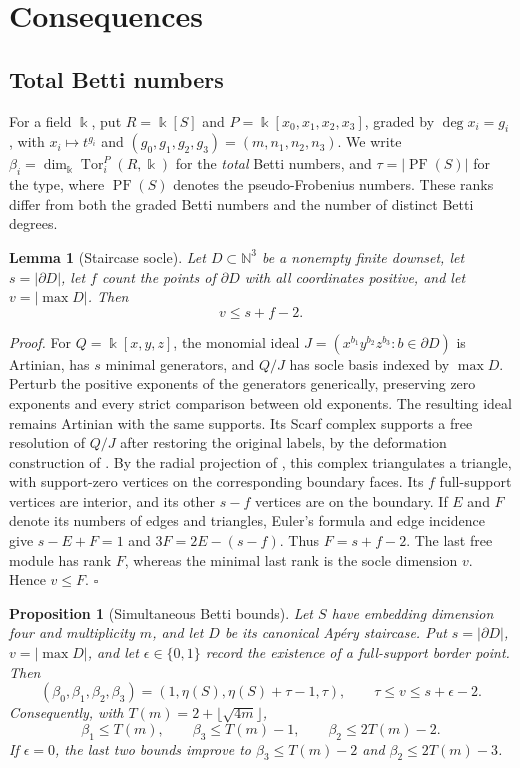 \documentclass[11pt]{article}
\newtheorem{lemma}[theorem]{Lemma}
\newtheorem{proposition}[theorem]{Proposition}
\begin{document}
\section{Consequences}\label{sec:betti}
\subsection{Total Betti numbers}

For a field $\Bbbk$, put $R=\Bbbk[S]$ and
$P=\Bbbk[x_0,x_1,x_2,x_3]$, graded by $\deg x_i=g_i$, with $x_i\mapsto t^{g_i}$ and
$(g_0,g_1,g_2,g_3)=(m,n_1,n_2,n_3)$.  We write
$\beta_i=\dim_{\Bbbk}\operatorname{Tor}_i^P(R,\Bbbk)$ for the
\emph{total} Betti numbers, and $\tau=|\operatorname{PF}(S)|$ for the type, where $\operatorname{PF}(S)$ denotes the pseudo-Frobenius numbers.
These ranks differ from both the graded Betti numbers and the number of
distinct Betti degrees.

\medskip
\begin{lemma}[Staircase socle]\label{lem:socle}
Let $D\subset\mathbb N^3$ be a nonempty finite downset, let
$s=|\partial D|$, let $f$ count the points of $\partial D$ with all
coordinates positive, and let $v=|\max D|$.  Then
\[
v\le s+f-2.
\]\end{lemma}
\emph{Proof.}
For $Q=\Bbbk[x,y,z]$, the monomial ideal
$J=(x^{b_1}y^{b_2}z^{b_3}:b\in\partial D)$ is Artinian, has $s$ minimal
generators, and $Q/J$ has socle basis indexed by $\max D$.
Perturb the positive exponents of the generators generically, preserving
zero exponents and every strict comparison between old exponents.
The resulting ideal remains Artinian with the same supports.  Its Scarf
complex supports a free resolution of $Q/J$ after restoring the original
labels, by the deformation construction of
\cite[Theorem~4.3 and Corollary~4.4]{BPS98}.
By the radial projection of \cite[Construction~5.4 and Corollary~5.5]{BPS98}, this complex triangulates a triangle, with support-zero vertices on the corresponding boundary faces.
Its $f$ full-support vertices are interior, and its other $s-f$ vertices
are on the boundary.  If $E$ and $F$ denote its numbers of edges and
triangles, Euler's formula and edge incidence give
$s-E+F=1$ and $3F=2E-(s-f)$.  Thus $F=s+f-2$.
The last free module has rank $F$, whereas the minimal last rank is the
socle dimension $v$.  Hence $v\le F$. \hfill$\square$

\medskip
\begin{proposition}[Simultaneous Betti bounds]\label{prop:betti}
Let $S$ have embedding dimension four and multiplicity $m$, and let
$D$ be its canonical Ap\'ery staircase.  Put $s=|\partial D|$,
$v=|\max D|$, and let $\epsilon\in\{0,1\}$ record the existence of a
full-support border point.  Then
\[
(\beta_0,\beta_1,\beta_2,\beta_3)
 = (1,\eta(S),\eta(S)+\tau-1,\tau),
\qquad
\tau\le v\le s+\epsilon-2.
\]
Consequently, with $T(m)=2+\lfloor\sqrt{4m}\rfloor$,
\[
\beta_1\le T(m),\qquad
\beta_3\le T(m)-1,\qquad
\beta_2\le 2T(m)-2.
\]
If $\epsilon=0$, the last two bounds improve to
$\beta_3\le T(m)-2$ and $\beta_2\le2T(m)-3$.\end{proposition}
\end{document}
